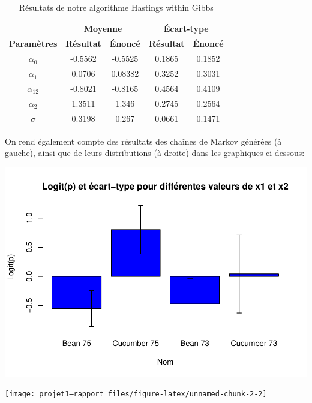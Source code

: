 \documentclass[
]{article}
\begin{document}
\begin{table}[h]
\centering
\small
\begin{minipage}{0.45\textwidth}
\centering
\begin{tabular}{|c|c|c|c|c|}
\hline
\multicolumn{1}{|c|}{} &
\multicolumn{2}{|c|}{\textbf{Moyenne}} & \multicolumn{2}{|c|}{\textbf{Écart-type}} \\
\hline
\textbf{Paramètres} & \textbf{Résultat} & \textbf{Énoncé} & \textbf{Résultat} & \textbf{Énoncé} \\
\hline
$\alpha_0$ & -0.5562 & -0.5525 & 0.1865 & 0.1852 \\
$\alpha_1$ & 0.0706 & 0.08382 & 0.3252 & 0.3031 \\
$\alpha_{12}$ & -0.8021 & -0.8165 & 0.4564 & 0.4109 \\
$\alpha_2$ & 1.3511 & 1.346 & 0.2745 & 0.2564 \\
$\sigma$ & 0.3198 & 0.267 & 0.0661 & 0.1471 \\
\hline
\end{tabular}
\caption{Résultats de notre algorithme Hastings within Gibbs}
\end{minipage}
\end{table}

On rend également compte des résultats des chaînes de Markov générées (à
gauche), ainsi que de leurs distributions (à droite) dans les graphiques
ci-dessous:

\begin{center}\includegraphics{projet1---rapport_files/figure-latex/unnamed-chunk-2-1} \end{center}

\begin{center}\texttt{[image: projet1---rapport\_files/figure-latex/unnamed-chunk-2-2]} \end{center}
\end{document}
